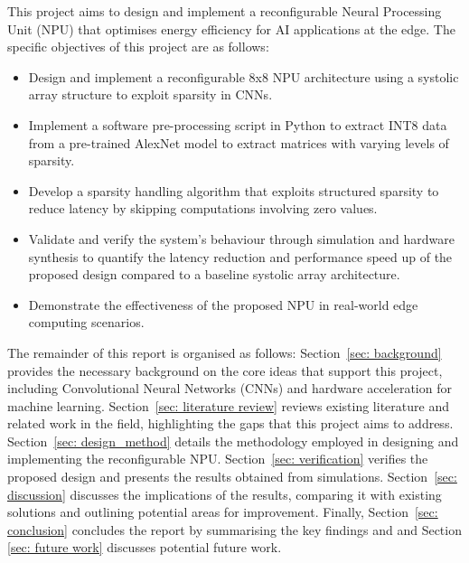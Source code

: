 \documentclass[12pt, a4paper, ukenglish]{article}
\begin{document}
    This project aims to design and implement a reconfigurable Neural Processing Unit (NPU) that optimises energy efficiency for AI applications at the edge. The specific objectives of this project are as follows:
    \begin{itemize}
        \item Design and implement a reconfigurable 8x8 NPU architecture using a systolic array structure to exploit sparsity in CNNs.
        \item Implement a software pre-processing script in Python to extract INT8 data from a pre-trained AlexNet model to extract matrices with varying levels of sparsity.
        \item Develop a sparsity handling algorithm that exploits structured sparsity to reduce latency by skipping computations involving zero values.
        \item Validate and verify the system's behaviour through simulation and hardware synthesis to quantify the latency reduction and performance speed up of the proposed design compared to a baseline systolic array architecture.
        \item Demonstrate the effectiveness of the proposed NPU in real-world edge computing scenarios.
    \end{itemize}

    The remainder of this report is organised as follows: Section~\ref{sec: background} provides the necessary background on the core ideas that support this project, including Convolutional Neural Networks (CNNs) and hardware acceleration for machine learning. Section~\ref{sec: literature review} reviews existing literature and related work in the field, highlighting the gaps that this project aims to address. Section~\ref{sec: design_method} details the methodology employed in designing and implementing the reconfigurable NPU. Section~\ref{sec: verification} verifies the proposed design and presents the results obtained from simulations. Section~\ref{sec: discussion} discusses the implications of the results, comparing it with existing solutions and outlining potential areas for improvement. Finally, Section~\ref{sec: conclusion} concludes the report by summarising the key findings and and Section \ref{sec: future work} discusses potential future work.
\end{document}

